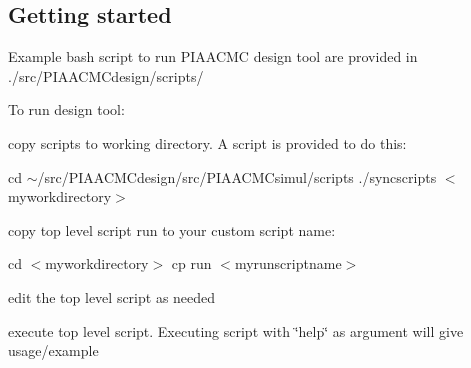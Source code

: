 \subsection*{Getting started}

Example bash script to run P\+I\+A\+A\+C\+M\+C design tool are provided in ./src/\+P\+I\+A\+A\+C\+M\+Cdesign/scripts/

To run design tool\+:
\begin{DoxyItemize}
\item copy scripts to working directory. A script is provided to do this\+:

cd $\sim$/src/\+P\+I\+A\+A\+C\+M\+Cdesign/src/\+P\+I\+A\+A\+C\+M\+Csimul/scripts ./syncscripts $<$myworkdirectory$>$
\item copy top level script run to your custom script name\+:

cd $<$myworkdirectory$>$ cp run $<$myrunscriptname$>$
\item edit the top level script as needed
\item execute top level script. Executing script with \char`\"{}help\char`\"{} as argument will give usage/example 
\end{DoxyItemize}